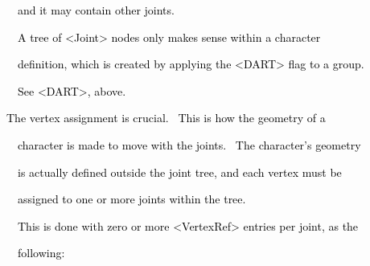 \documentclass[a4paper]{article}
\newcommand\textstyleOOoComputerKeyWord[1]{\textrm{\textcolor[rgb]{0.0,0.0,0.5019608}{#1}}}
\begin{document}
{\color{black}
\textstyleOOoComputerKeyWord{\textcolor{black}{\ \ and it may contain other joints.}}}


\bigskip

{\color{black}
\textstyleOOoComputerKeyWord{\textcolor{black}{\ \ A tree of {\textless}Joint{\textgreater} nodes only makes sense
within a character}}}

{\color{black}
\textstyleOOoComputerKeyWord{\textcolor{black}{\ \ definition, which is created by applying the
{\textless}DART{\textgreater} flag to a group.}}}

{\color{black}
\textstyleOOoComputerKeyWord{\textcolor{black}{\ \ See {\textless}DART{\textgreater}, above.}}}

\clearpage
\bigskip

{\color{black}
\textstyleOOoComputerKeyWord{\textcolor{black}{The vertex assignment is crucial. \ This is how the geometry of a}}}

{\color{black}
\textstyleOOoComputerKeyWord{\textcolor{black}{\ \ character is made to move with the joints. \ The character's
geometry}}}

{\color{black}
\textstyleOOoComputerKeyWord{\textcolor{black}{\ \ is actually defined outside the joint tree, and each vertex must
be}}}

{\color{black}
\textstyleOOoComputerKeyWord{\textcolor{black}{\ \ assigned to one or more joints within the tree.}}}

{\color{black}
\textstyleOOoComputerKeyWord{\textcolor{black}{\ \ This is done with zero or more {\textless}VertexRef{\textgreater}
entries per joint, as the}}}

{\color{black}
\textstyleOOoComputerKeyWord{\textcolor{black}{\ \ following:}}}


\bigskip
\end{document}
